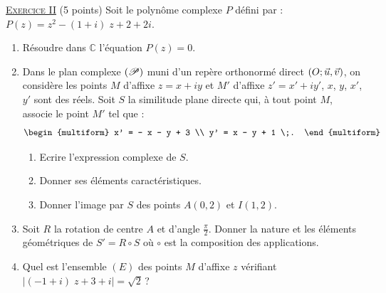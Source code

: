\noindent \underline{\textsc{Exercice II}} (5 points) \newline
      Soit le polyn\^ome complexe $P$ d\'efini par : $P(z) = z^2 - (1 + i) \; z + 2 + 2 i$.
      \begin{enumerate}
            \item R\'esoudre dans $\mathbb{C}$ l'\'equation $P(z) = 0$.
            \item Dans le plan complexe $(\mathscr{P})$ muni d'un rep\`ere orthonorm\'e direct $(O ; \vec{u} , \vec{v})$, on consid\`ere les points $M$
                  d'affixe $z = x + iy$ et $M'$ d'affixe $z' = x' + i y'$, $x$, $y$, $x'$, $y'$ sont des r\'eels.
                  Soit $S$ la similitude plane directe qui, \`a tout point $M$, associe le point $M'$ tel que :
                  \[
                        \begin{multiform}
                              x' = - x - y + 3 \\
                              y' = x - y + 1 \;.
                        \end{multiform}
                  \]
                  \begin{enumerate}
                        \item Ecrire l'expression complexe de $S$.
                        \item Donner ses \'el\'ements caract\'eristiques.
                        \item Donner l'image par $S$ des points $A(0,2)$ et $I(1,2)$.
                  \end{enumerate}
            \item Soit $R$ la rotation de centre $A$ et d'angle $\frac{\pi}{2}$.
                  Donner la nature et les \'el\'ements g\'eom\'etriques de $S' = R \circ S$ o\`u $\circ$ est la 
                  composition des applications.
            \item Quel est l'ensemble $(E)$ des points $M$ d'affixe $z$ v\'erifiant $| (-1+i) \; z + 3 + i | = \sqrt{2}$\,?
      \end{enumerate}
